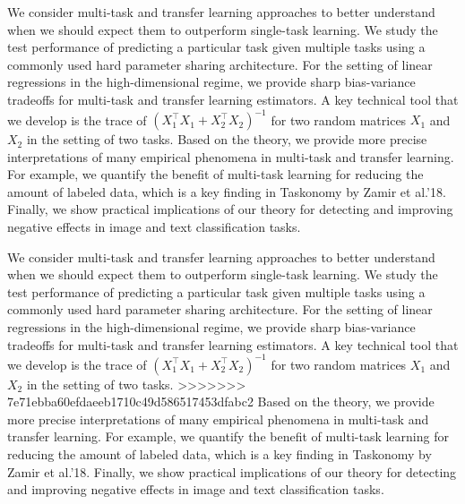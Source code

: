 	We consider multi-task and transfer learning approaches to better understand when we should expect them to outperform single-task learning.
	We study the test performance of predicting a particular task given multiple tasks using a commonly used hard parameter sharing architecture.
	For the setting of linear regressions in the high-dimensional regime, we provide sharp bias-variance tradeoffs for multi-task and transfer learning estimators.
	A key technical tool that we develop is the trace of $(X_1^{\top}X_1 + X_2^{\top}X_2)^{-1}$ for two random matrices $X_1$ and $X_2$ in the setting of two tasks.
	Based on the theory, we provide more precise interpretations of many empirical phenomena in multi-task and transfer learning.
	For example, we quantify the benefit of multi-task learning for reducing the amount of labeled data, which is a key finding in Taskonomy by Zamir et al.'18.
	Finally, we show practical implications of our theory for detecting and improving negative effects in image and text classification tasks.





	We consider multi-task and transfer learning approaches to better understand when we should expect them to outperform single-task learning.
	We study the test performance of predicting a particular task given multiple tasks using a commonly used hard parameter sharing architecture.
	For the setting of linear regressions in the high-dimensional regime, we provide sharp bias-variance tradeoffs for multi-task and transfer learning estimators.
	A key technical tool that we develop is the trace of $(X_1^{\top}X_1 + X_2^{\top}X_2)^{-1}$ for two random matrices $X_1$ and $X_2$ in the setting of two tasks.
>>>>>>> 7e71ebba60efdaeeb1710c49d586517453dfabc2
	Based on the theory, we provide more precise interpretations of many empirical phenomena in multi-task and transfer learning.
	For example, we quantify the benefit of multi-task learning for reducing the amount of labeled data, which is a key finding in Taskonomy by Zamir et al.'18.
	Finally, we show practical implications of our theory for detecting and improving negative effects in image and text classification tasks.



